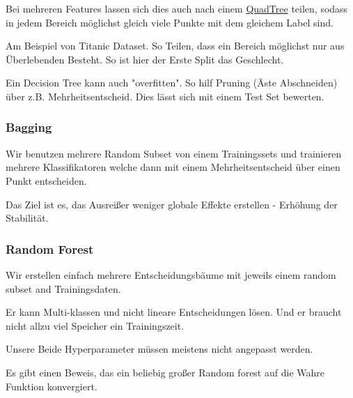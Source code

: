 \documentclass[a4paper]{article}
\begin{document}
Bei mehreren Features lassen sich dies auch nach einem \href{https://de.wikipedia.org/wiki/Quadtree}{QuadTree} teilen, sodass in jedem Bereich möglichst gleich viele Punkte mit dem gleichem Label sind.

Am Beispiel von Titanic Dataset. So Teilen, dass ein Bereich möglichst nur aus Überlebenden Besteht. So ist hier der Erste Split das Geschlecht.

Ein Decision Tree kann auch "overfitten". So hilf Pruning (Äste Abschneiden) über z.B. Mehrheitsentscheid. Dies lässt sich mit einem Test Set bewerten.


\subsubsection{Bagging}

Wir benutzen mehrere Random Subset von einem Trainingssets und trainieren mehrere Klassifikatoren welche dann mit einem Mehrheitsentscheid über einen Punkt entscheiden.

Das Ziel ist es, das Ausreißer weniger globale Effekte erstellen - Erhöhung der Stabilität.

\subsubsection{Random Forest}

Wir erstellen einfach mehrere Entscheidungsbäume mit jeweils einem random subset and Trainingsdaten.

Er kann Multi-klassen und nicht lineare Entscheidungen lösen. Und er braucht nicht allzu viel Speicher ein Trainingszeit.

Unsere Beide Hyperparameter müssen meistens nicht angepasst werden.

Es gibt einen Beweis, das ein beliebig großer Random forest auf die Wahre Funktion konvergiert.
\end{document}
